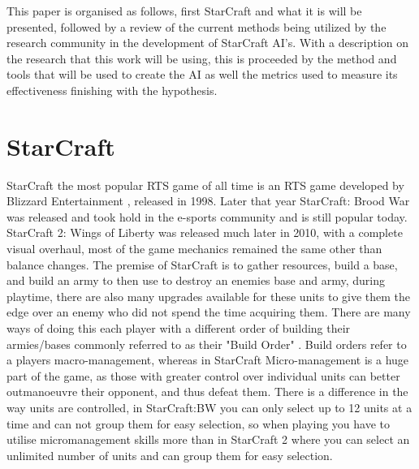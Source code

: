 \documentclass[journal]{IEEEtran}
\begin{document}
This paper is organised as follows, first StarCraft and what it is will be presented, followed by a review of the current methods being utilized by the research community in the development of StarCraft AI's. With a description on the research that this work will be using, this is proceeded by the method and tools that will be used to create the AI as well the metrics used to measure its effectiveness finishing with the hypothesis.


\section{StarCraft}
StarCraft the most popular RTS game of all time \cite{Current} is an RTS game developed by Blizzard Entertainment \cite{Blizzard,Release}, released in 1998. Later that year StarCraft: Brood War was released and took hold in the e-sports community and is still popular today. StarCraft 2: Wings of Liberty was released much later in 2010, with a complete visual overhaul, most of the game mechanics remained the same other than balance changes. The premise of StarCraft is to gather resources, build a base, and build an army to then use to destroy an enemies base and army, during playtime, there are also many upgrades available for these units to give them the edge over an enemy who did not spend the time acquiring them. There are many ways of doing this each player with a different order of building their armies/bases commonly referred to as their "Build Order" \cite{BuildOrder}. Build orders refer to a players macro-management, whereas in StarCraft Micro-management is a huge part of the game, as those with greater control over individual units can better outmanoeuvre their opponent, and thus defeat them. There is a difference in the way units are controlled, in StarCraft:BW you can only select up to 12 units at a time and can not group them for easy selection, so when playing you have to utilise micromanagement skills more than in StarCraft 2 where you can select an unlimited number of units and can group them for easy selection.
\end{document}
